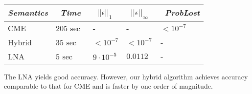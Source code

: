 \documentclass{llncs}
\begin{document}
{\footnotesize \begin{center}
\renewcommand{\baselinestretch}{.8}
	\begin{tabular}{|l|l|l|l|l|}
	\hline
	\emph{Semantics}            &  \,		\emph{Time}	 \,  & \, $||\epsilon||_{1}$ \, 	  & \,  	$||\epsilon||_{\infty}$ \, &	\, 	  \emph{ProbLost}    \\ 
	\hline
	CME        & 		  $205$ sec           	 & 	- & - & 	$<10^{-7}$    \\ 
	Hybrid   & 		  $35$   sec      	 & 	 	$ <10^{-7}$     &  $<10^{-7}$ & -  \\  
	LNA   & 		  $5$   sec      	 & 	 	$9\cdot 10^{-5}$     &  $0.0112$ & -  \\  
	\hline
	\end{tabular}
\end{center}}
The LNA yields good accuracy. However, our hybrid algorithm achieves accuracy comparable to that for CME and is faster by one order of magnitude.
\end{document}
